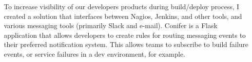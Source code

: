 {
  To increase visibility of our developers products during build/deploy process, I created a solution that interfaces between Nagios, Jenkins, and other tools, and various messaging tools (primarily Slack and e-mail). Conifer is a Flask application that allows developers to create rules for routing messaging events to their preferred notification system. This allows teams to subscribe to build failure events, or service failures in a dev environment, for example.
}
